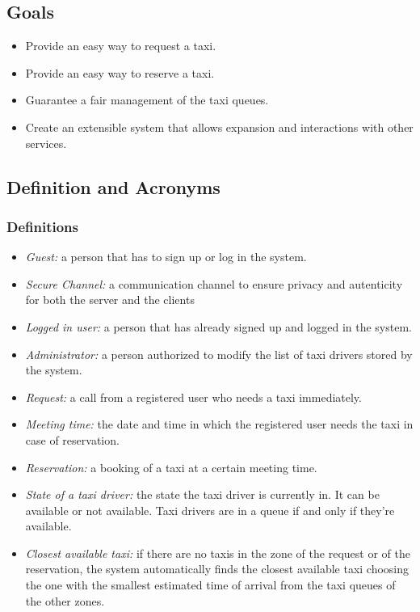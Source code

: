 \documentclass{article}
\begin{document}
\subsection{Goals}
\begin{itemize}
	\item Provide an easy way to request a taxi.
	\item Provide an easy way to reserve a taxi.
	\item Guarantee a fair management of the taxi queues.
	\item Create an extensible system that allows expansion and interactions with other services.
\end{itemize}

\subsection{Definition and Acronyms}

\subsubsection{Definitions}
\begin{itemize}
	\item \textit{Guest:} a person that has to sign up or log in the system.
	\item \textit{Secure Channel:} a communication channel to ensure privacy and autenticity for both the server and the clients 
	\item \textit{Logged in user:} a person that has already signed up and logged in the system.
	\item \textit{Administrator:} a person authorized to modify the list of taxi drivers stored by the system.
	\item \textit{Request:} a call from a registered user who needs a taxi immediately.
	\item \textit{Meeting time:} the date and time in which the registered user needs the taxi in case of reservation. %
	\item \textit{Reservation:} a booking of a taxi at a certain meeting time.
	\item \textit{State of a taxi driver:} the state the taxi driver is currently in. It can be available or not available. Taxi drivers are in a queue if and only if they're available.
	\item \textit{Closest available taxi:} if there are no taxis in the zone of the request or of the reservation, the system automatically finds the closest available taxi choosing the one with the smallest estimated time of arrival from the taxi queues of the other zones.
\end{itemize}
\end{document}
